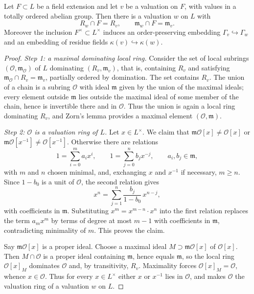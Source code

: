 \begin{proposition}
\label{prop:chevalley-extension}
Let $F\subset L$ be a field extension and let $v$ be a valuation on $F$,
with values in a totally ordered abelian group. Then there is a valuation
$w$ on $L$ with
\[
 R_w\cap F=R_v,
 \qquad
 \mathfrak m_w\cap F=\mathfrak m_v.
\]
Moreover the inclusion $F^\times\subset L^\times$ induces an
order-preserving embedding $\Gamma_v\hookrightarrow\Gamma_w$ and an
embedding of residue fields $\kappa(v)\hookrightarrow\kappa(w)$.
\end{proposition}
\begin{proof}
\emph{Step 1: a maximal dominating local ring.} Consider the set of local
subrings $(\mathcal O,\mathfrak m_{\mathcal O})$ of $L$ dominating
$(R_v,\mathfrak m_v)$, that is, containing $R_v$ and satisfying
$\mathfrak m_{\mathcal O}\cap R_v=\mathfrak m_v$, partially ordered by
domination. The set contains $R_v$. The union of a chain is a subring
$\mathcal O$ with ideal $\mathfrak m$ given by the union of the maximal
ideals; every element outside $\mathfrak m$ lies outside the maximal ideal
of some member of the chain, hence is invertible there and in
$\mathcal O$. Thus the union is again a local ring dominating $R_v$, and
Zorn's lemma provides a maximal element $(\mathcal O,\mathfrak m)$.

\emph{Step 2: $\mathcal O$ is a valuation ring of $L$.} Let $x\in L^\times$.
We claim that $\mathfrak m\mathcal O[x]\neq\mathcal O[x]$ or
$\mathfrak m\mathcal O[x^{-1}]\neq\mathcal O[x^{-1}]$. Otherwise there are
relations
\[
 1=\sum_{i=0}^{m}a_ix^i,
 \qquad
 1=\sum_{j=0}^{n}b_jx^{-j},
 \qquad a_i,b_j\in\mathfrak m,
\]
with $m$ and $n$ chosen minimal, and, exchanging $x$ and $x^{-1}$ if
necessary, $m\geq n$. Since $1-b_0$ is a unit of $\mathcal O$, the second
relation gives
\[
 x^{n}=\sum_{j=1}^{n}\frac{b_j}{1-b_0}\,x^{n-j},
\]
with coefficients in $\mathfrak m$. Substituting
$x^{m}=x^{m-n}\cdot x^{n}$ into the first relation replaces the term
$a_mx^m$ by terms of degree at most $m-1$ with coefficients in
$\mathfrak m$, contradicting minimality of $m$. This proves the claim.

Say $\mathfrak m\mathcal O[x]$ is a proper ideal. Choose a maximal ideal
$M\supset\mathfrak m\mathcal O[x]$ of $\mathcal O[x]$. Then
$M\cap\mathcal O$ is a proper ideal containing $\mathfrak m$, hence equals
$\mathfrak m$, so the local ring $\mathcal O[x]_M$ dominates $\mathcal O$
and, by transitivity, $R_v$. Maximality forces
$\mathcal O[x]_M=\mathcal O$, whence $x\in\mathcal O$. Thus for every
$x\in L^\times$ either $x$ or $x^{-1}$ lies in $\mathcal O$, and
 makes $\mathcal O$ the
valuation ring of a valuation $w$ on $L$.


\end{proof}
